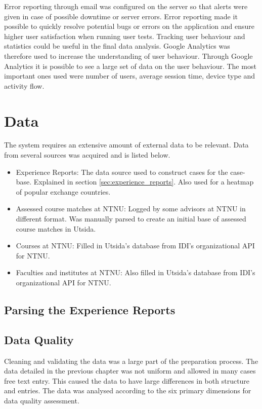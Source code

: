 Error reporting through email was configured on the server so that alerts were given in case of possible downtime or server errors. Error reporting made it possible to quickly resolve potential bugs or errors on the application and ensure higher user satisfaction when running user tests. Tracking user behaviour and statistics could be useful in the final data analysis. Google Analytics was therefore used to increase the understanding of user behaviour. Through Google Analytics it is possible to see a large set of data on the user behaviour. The most important ones used were number of users, average session time, device type and activity flow.  

\section{Data}

The system requires an extensive amount of external data to be relevant. Data from several sources was acquired and is listed below.

\begin{itemize}
    \item Experience Reports: The data source used to construct cases for the case-base. Explained in section \ref{sec:experience_reports}. Also used for a heatmap of popular exchange countries. 
    \item Assessed course matches at NTNU: Logged by some advisors at NTNU in different format. Was manually parsed to create an initial base of assessed course matches in Utsida.
    \item Courses at NTNU: Filled in Utsida's database from IDI's organizational API for NTNU. 
    \item Faculties and institutes at NTNU: Also filled in Utsida's database from IDI's organizational API for NTNU.
\end{itemize}

\subsection{Parsing the Experience Reports}

\subsection{Data Quality}
Cleaning and validating the data was a large part of the preparation process. The data detailed in the previous chapter was not uniform and allowed in many cases free text entry. This caused the data to have large differences in both structure and entries. The data was analysed according to the six primary dimensions for data quality assessment\cite{askham2013six}.

